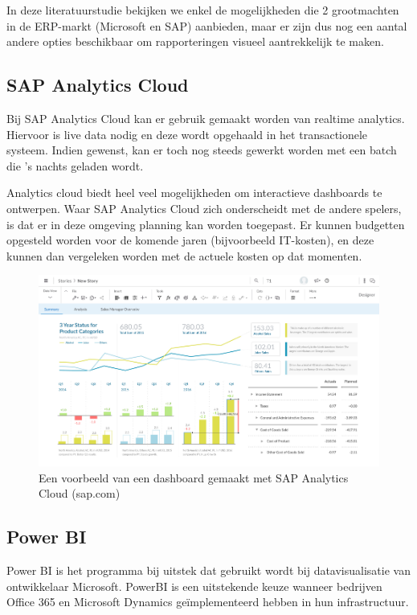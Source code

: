 In deze literatuurstudie bekijken we enkel de mogelijkheden die 2 grootmachten in de ERP-markt (Microsoft en SAP) aanbieden, maar er zijn dus nog een aantal andere opties beschikbaar om rapporteringen visueel aantrekkelijk te maken. 

\subsection{SAP Analytics Cloud}
Bij SAP Analytics Cloud kan er gebruik gemaakt worden van realtime analytics. Hiervoor is live data nodig en deze wordt opgehaald in het transactionele systeem. Indien gewenst, kan er toch nog steeds gewerkt worden met een batch die 's nachts geladen wordt. 

Analytics cloud biedt heel veel mogelijkheden om interactieve dashboards te ontwerpen. Waar SAP Analytics Cloud zich onderscheidt met de andere spelers, is dat er in deze omgeving planning kan worden toegepast. Er kunnen budgetten opgesteld worden voor de komende jaren (bijvoorbeeld IT-kosten), en deze kunnen dan vergeleken worden met de actuele kosten op dat momenten. 

\begin{figure}[h]
	\centering
	\includegraphics[scale=0.45]{../images/sac.png}
	\caption{Een voorbeeld van een dashboard gemaakt met SAP Analytics Cloud (sap.com)}
	\label{fig:sac}
\end{figure}

\subsection{Power BI}
Power BI is het programma bij uitstek dat gebruikt wordt bij datavisualisatie van ontwikkelaar Microsoft. PowerBI is een uitstekende keuze wanneer bedrijven Office 365 en Microsoft Dynamics geïmplementeerd hebben in hun infrastructuur.

